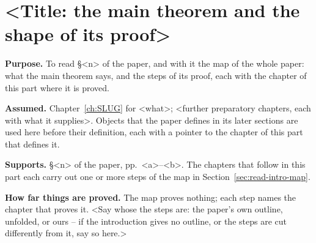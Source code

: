 %
%
%
%
%
\chapter{<Title: the main theorem and the shape of its proof>}
\label{ch:read-intro}

\begin{chapterheader}
\textbf{Purpose.}
To read \S<n> of the paper, and with it the map of the whole paper: what the
main theorem says, and the steps of its proof, each with the chapter of this
part where it is proved.

\medskip
\textbf{Assumed.}
Chapter~\ref{ch:SLUG} for <what>; <further preparatory chapters, each with
what it supplies>.  Objects that the paper defines in its later sections are
used here before their definition, each with a pointer to the chapter of this
part that defines it.

\medskip
\textbf{Supports.}
\S<n> of the paper, pp.~<a>--<b>.  The chapters that follow in this part each
carry out one or more steps of the map in
Section~\ref{sec:read-intro-map}.

\medskip
\textbf{How far things are proved.}
The map proves nothing; each step names the chapter that proves it.  <Say
whose the steps are: the paper's own outline, unfolded, or ours -- if the
introduction gives no outline, or the steps are cut differently from it, say
so here.>
\end{chapterheader}

